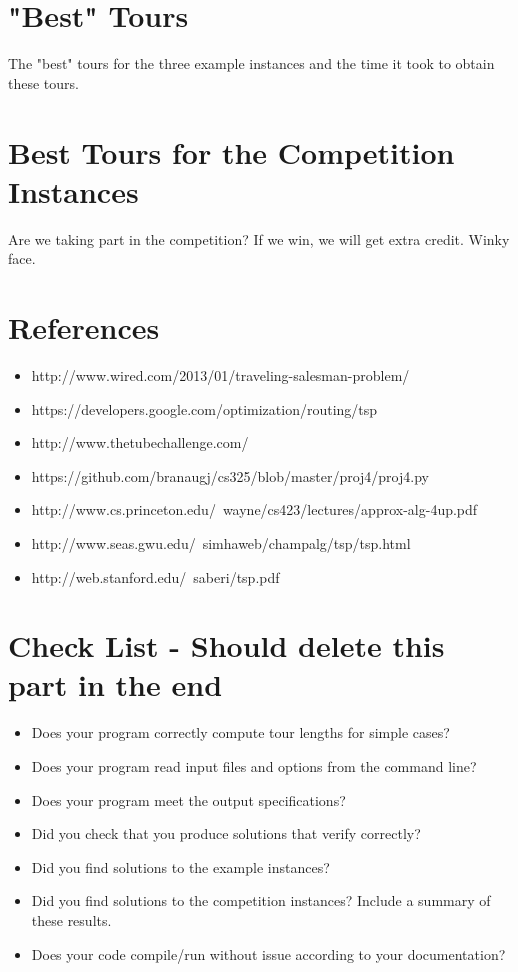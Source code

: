 \documentclass[11pt,letterpaper]{article}
\begin{document}
\section*{"Best" Tours}
The "best" tours for the three example instances and the time it took to obtain these tours.

\section*{Best Tours for the Competition Instances}
Are we taking part in the competition? If we win, we will get extra credit. Winky face.

\section*{References}
\begin{itemize}
	\item http://www.wired.com/2013/01/traveling-salesman-problem/
	\item https://developers.google.com/optimization/routing/tsp
	\item http://www.thetubechallenge.com/
	\item https://github.com/branaugj/cs325/blob/master/proj4/proj4.py
	\item http://www.cs.princeton.edu/~wayne/cs423/lectures/approx-alg-4up.pdf
	\item http://www.seas.gwu.edu/~simhaweb/champalg/tsp/tsp.html
	\item http://web.stanford.edu/~saberi/tsp.pdf
\end{itemize}

\section*{Check List - Should delete this part in the end}
\begin{itemize}
	\item Does your program correctly compute tour lengths for simple cases?
	\item Does your program read input files and options from the command line?
	\item Does your program meet the output specifications?
	\item Did you check that you produce solutions that verify correctly?
	\item Did you find solutions to the example instances?
	\item Did you find solutions to the competition instances? Include a summary of these results.
	\item Does your code compile/run without issue according to your documentation?
\end{itemize}
\end{document}

